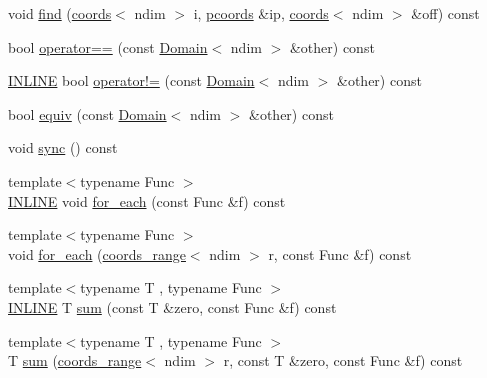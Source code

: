 \begin{DoxyCompactItemize}
\item 
void \hyperlink{classshark_1_1ndim_1_1_domain_a887ed57ec5fd3db43d7d947876620529}{find} (\hyperlink{structshark_1_1ndim_1_1coords}{coords}$<$ ndim $>$ i, \hyperlink{classshark_1_1ndim_1_1_domain_a9684ccd8af33cff7639c782290ac37ee}{pcoords} \&ip, \hyperlink{structshark_1_1ndim_1_1coords}{coords}$<$ ndim $>$ \&off) const
\item 
bool \hyperlink{classshark_1_1ndim_1_1_domain_a8e718f1cacc0c3f82197ac1d5a54d853}{operator==} (const \hyperlink{classshark_1_1ndim_1_1_domain}{Domain}$<$ ndim $>$ \&other) const
\item 
\hyperlink{common_8hpp_a2eb6f9e0395b47b8d5e3eeae4fe0c116}{I\+N\+L\+I\+NE} bool \hyperlink{classshark_1_1ndim_1_1_domain_a362605b2c4faa8f7164433f647bcd6cb}{operator!=} (const \hyperlink{classshark_1_1ndim_1_1_domain}{Domain}$<$ ndim $>$ \&other) const
\item 
bool \hyperlink{classshark_1_1ndim_1_1_domain_a9b488b909423d2decfce5aa505b78583}{equiv} (const \hyperlink{classshark_1_1ndim_1_1_domain}{Domain}$<$ ndim $>$ \&other) const
\item 
void \hyperlink{classshark_1_1ndim_1_1_domain_a8b68baf8f38340b6b550ebe4c3476c0b}{sync} () const
\item 
{\footnotesize template$<$typename Func $>$ }\\\hyperlink{common_8hpp_a2eb6f9e0395b47b8d5e3eeae4fe0c116}{I\+N\+L\+I\+NE} void \hyperlink{classshark_1_1ndim_1_1_domain_aa234c8c238090b7dd05f9df07c39f223}{for\+\_\+each} (const Func \&f) const
\item 
{\footnotesize template$<$typename Func $>$ }\\void \hyperlink{classshark_1_1ndim_1_1_domain_a109960d03c4d1900acbb482d1be9c284}{for\+\_\+each} (\hyperlink{structshark_1_1ndim_1_1coords__range}{coords\+\_\+range}$<$ ndim $>$ r, const Func \&f) const
\item 
{\footnotesize template$<$typename T , typename Func $>$ }\\\hyperlink{common_8hpp_a2eb6f9e0395b47b8d5e3eeae4fe0c116}{I\+N\+L\+I\+NE} T \hyperlink{classshark_1_1ndim_1_1_domain_a4acf8890a0637ff9987c4dea1f72bf79}{sum} (const T \&zero, const Func \&f) const
\item 
{\footnotesize template$<$typename T , typename Func $>$ }\\T \hyperlink{classshark_1_1ndim_1_1_domain_a500c17d3dc9dc33f0714779306d44b35}{sum} (\hyperlink{structshark_1_1ndim_1_1coords__range}{coords\+\_\+range}$<$ ndim $>$ r, const T \&zero, const Func \&f) const

\end{DoxyCompactItemize}
